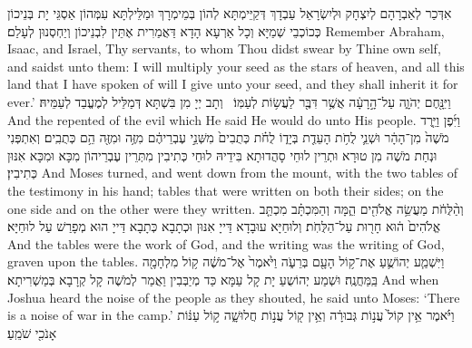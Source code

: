 {אִדְּכַר לְאַבְרָהָם לְיִצְחָק וּלְיִשְׂרָאֵל עַבְדָךְ דְּקַיֵּימְתָּא לְהוֹן בְּמֵימְרָךְ וּמַלֵּילְתָּא עִמְּהוֹן אַסְגֵּי יָת בְּנֵיכוֹן כְּכוֹכְבֵי שְׁמַיָּא וְכָל אַרְעָא הָדָא דַּאֲמַרִית אֶתֵּין לִבְנֵיכוֹן וְיַחְסְנוּן לְעָלַם׃}
{Remember Abraham, Isaac, and Israel, Thy servants, to whom Thou didst swear by Thine own self, and saidst unto them: I will multiply your seed as the stars of heaven, and all this land that I have spoken of will I give unto your seed, and they shall inherit it for ever.’}{}
{וַיִּנָּ֖חֶם יְהֹוָ֑ה עַל־הָ֣רָעָ֔ה אֲשֶׁ֥ר דִּבֶּ֖ר לַעֲשׂ֥וֹת לְעַמּֽוֹ׃ \petucha }
{וְתָב יְיָ מִן בִּשְׁתָּא דְּמַלֵּיל לְמֶעֱבַד לְעַמֵּיהּ׃}
{And the \lord\space repented of the evil which He said He would do unto His people.}{}
{וַיִּ֜פֶן וַיֵּ֤רֶד מֹשֶׁה֙ מִן־הָהָ֔ר וּשְׁנֵ֛י לֻחֹ֥ת הָעֵדֻ֖ת בְּיָד֑וֹ לֻחֹ֗ת כְּתֻבִים֙ מִשְּׁנֵ֣י עֶבְרֵיהֶ֔ם מִזֶּ֥ה וּמִזֶּ֖ה הֵ֥ם כְּתֻבִֽים׃
}
{וְאִתְפְּנִי וּנְחַת מֹשֶׁה מִן טוּרָא וּתְרֵין לוּחֵי סָהֲדוּתָא בִּידֵיהּ לוּחֵי כְּתִיבִין מִתְּרֵין עֶבְרֵיהוֹן מִכָּא וּמִכָּא אִנּוּן כְּתִיבִין׃}
{And Moses turned, and went down from the mount, with the two tables of the testimony in his hand; tables that were written on both their sides; on the one side and on the other were they written.}{}
{וְהַ֨לֻּחֹ֔ת מַעֲשֵׂ֥ה אֱלֹהִ֖ים הֵ֑מָּה וְהַמִּכְתָּ֗ב מִכְתַּ֤ב אֱלֹהִים֙ ה֔וּא חָר֖וּת עַל־הַלֻּחֹֽת׃
}
{וְלוּחַיָּא עוּבָדָא דַּייָ אִנּוּן וּכְתָבָא כְּתָבָא דַּייָ הוּא מְפָרַשׁ עַל לוּחַיָּא׃}
{And the tables were the work of God, and the writing was the writing of God, graven upon the tables.}{}
{וַיִּשְׁמַ֧ע יְהוֹשֻׁ֛עַ אֶת־ק֥וֹל הָעָ֖ם בְּרֵעֹ֑ה וַיֹּ֙אמֶר֙ אֶל־מֹשֶׁ֔ה ק֥וֹל מִלְחָמָ֖ה בַּֽמַּחֲנֶֽה׃
}
{וּשְׁמַע יְהוֹשֻעַ יָת קָל עַמָּא כַּד מְיַבְּבִין וַאֲמַר לְמֹשֶׁה קָל קְרָבָא בְּמַשְׁרִיתָא׃}
{And when Joshua heard the noise of the people as they shouted, he said unto Moses: ‘There is a noise of war in the camp.’}{}
{וַיֹּ֗אמֶר אֵ֥ין קוֹל֙ עֲנ֣וֹת גְּבוּרָ֔ה וְאֵ֥ין ק֖וֹל עֲנ֣וֹת חֲלוּשָׁ֑ה ק֣וֹל עַנּ֔וֹת אָנֹכִ֖י שֹׁמֵֽעַ׃
}
